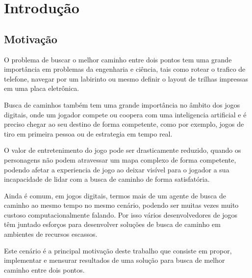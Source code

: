 
\chapter[Introdução]{Introdução}

\section{Motivação}

O problema de buscar o melhor caminho entre dois pontos tem uma grande importância em problemas da engenharia e ciência, tais como rotear o trafico de telefone, navegar por um labirinto ou mesmo definir o layout de trilhas impressas em uma placa eletrônica.

Busca de caminhos também tem uma grande importância no âmbito dos jogos digitais, onde um jogador compete ou coopera com uma inteligencia artificial e é preciso chegar ao seu destino de forma competente, como por exemplo, jogos de tiro em primeira pessoa ou de estrategia em tempo real.

O valor de entretenimento do jogo pode ser drasticamente reduzido, quando os personagens não podem atravessar um mapa complexo de forma competente, podendo afetar a experiencia de jogo ao deixar visível para o jogador a sua incapacidade de lidar com a busca de caminho de forma satisfatória.

Ainda é comum, em jogos digitais, termos mais de um agente de busca de caminho ao mesmo tempo no mesmo cenário, podendo ser muitas vezes muito custoso computacionalmente falando. Por isso vários desenvolvedores de jogos têm juntado esforços para desenvolver soluções de busca de caminho em ambientes de recursos escassos. \cite{Pontevia}

Este cenário é a principal motivação deste trabalho que consiste em propor, implementar e mensurar resultados de uma solução para busca de melhor caminho entre dois pontos.



	


